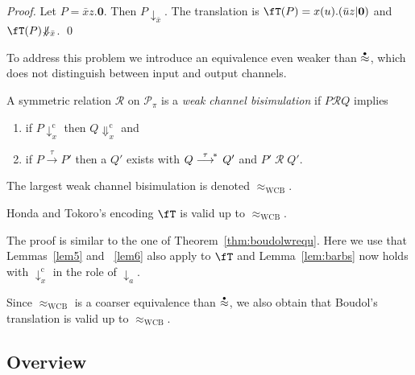 \documentclass[runningheads]{llncs}
\newcommand{\thm}[1]{Theorem~\ref{thm:#1}}
\newcommand{\lem}[1]{Lemma~\ref{lem:#1}}
\newcommand{\T}{\mathcal{P}}             %
\newcommand{\transtau}{\mathrel{\raisebox{0pt}[8pt][0pt]{$\stackrel{\tau}{\longrightarrow}$}^{\!*\,}}}
\newcommand{\wbb}{\stackrel{\raisebox{-1pt}[0pt][0pt]{$\scriptscriptstyle \bullet$}}{\approx}}
\newcommand{\wlbsim}{\ensuremath{\mathrel{\approx_{\mathrm{WCB}}}}}
\newcommand{\wcomm}{\ocomm}
\newcommand{\scomm}{\sbarb}
\newcommand{\sbarb}[1]{{\downarrow_{#1}}}
\newcommand{\ocomm}[1]{{\Downarrow_{#1}}}
\newcommand{\ascomm}[1]{\downarrow^{\mathrm{c}}_{#1}}
\newcommand{\acomm}[1]{\Downarrow^{\mathrm{c}}_{#1}}
\newcommand{\mrel}{\ensuremath{\mathrel{\mathcal{R}}}}
\newcommand{\sI}{\fT}
\begin{document}
\begin{proof}
Let $P = \bar{x}z.\bm{0}$.
Then $P \scomm {\bar{x}}$.
The translation is $\sI(P) = x(u).(\bar{u}z|\bm{0})$ and
$\sI(P) {\not\!\wcomm {\bar{x}}}$.
\qed
\end{proof}

\noindent
To address this problem we introduce an equivalence even weaker than $\wbb$, which does not distinguish between input and output channels.

\begin{definition}\rm\label{df:channel bis}
A symmetric relation {\mrel} on $\T_\pi$ is a {\em weak channel bisimulation}
if $P\mrel Q$ implies
\begin{enumerate}
\item if $P \ascomm x$ then $Q \acomm x$ and
\item if $P \stackrel{\tau}{\longrightarrow} P'$ then a $Q'$ exists with
  $Q \transtau Q'$ and $P'\mathop{\mrel} Q'\!$.%
\end{enumerate}
The largest weak channel bisimulation is denoted $\wlbsim$.
\end{definition}

\begin{theorem}\rm
Honda and Tokoro's encoding $\sI$
is valid up to $\wlbsim$.
\end{theorem}

\noindent
The proof is similar to the one of \thm{boudolwrequ}. %
Here we use that Lemmas~\ref{lem5} and ~\ref{lem6} also apply to $\sI$ \cite{vG18a}
and \lem{barbs} now holds with $\ascomm{x}$ in the role of $\scomm{a}$.

Since $\wlbsim$ is a coarser equivalence than $\wbb$, we  also obtain
that Boudol's translation is valid up to $\wlbsim$.


\subsection{Overview}
\end{document}
